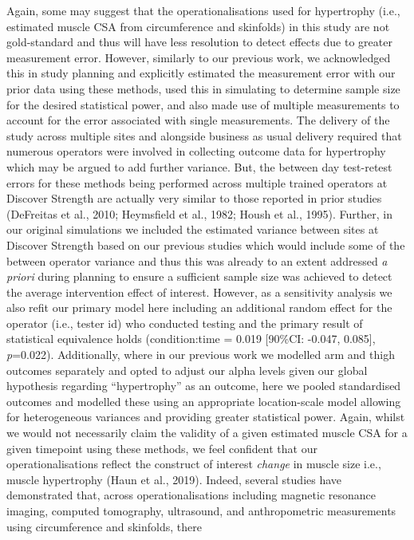 \documentclass[
]{article}
\begin{document}
Again, some may suggest that the operationalisations used for
hypertrophy (i.e., estimated muscle CSA from circumference and
skinfolds) in this study are not gold-standard and thus will have less
resolution to detect effects due to greater measurement error. However,
similarly to our previous work, we acknowledged this in study planning
and explicitly estimated the measurement error with our prior data using
these methods, used this in simulating to determine sample size for the
desired statistical power, and also made use of multiple measurements to
account for the error associated with single measurements. The delivery
of the study across multiple sites and alongside business as usual
delivery required that numerous operators were involved in collecting
outcome data for hypertrophy which may be argued to add further
variance. But, the between day test-retest errors for these methods
being performed across multiple trained operators at Discover Strength
are actually very similar to those reported in prior studies (DeFreitas
et al., 2010; Heymsfield et al., 1982; Housh et al., 1995). Further, in
our original simulations we included the estimated variance between
sites at Discover Strength based on our previous studies which would
include some of the between operator variance and thus this was already
to an extent addressed \emph{a priori} during planning to ensure a
sufficient sample size was achieved to detect the average intervention
effect of interest. However, as a sensitivity analysis we also refit our
primary model here including an additional random effect for the
operator (i.e., tester id) who conducted testing and the primary result
of statistical equivalence holds (condition:time = 0.019 {[}90\%CI:
-0.047, 0.085{]}, \emph{p}=0.022). Additionally, where in our previous
work we modelled arm and thigh outcomes separately and opted to adjust
our alpha levels given our global hypothesis regarding ``hypertrophy''
as an outcome, here we pooled standardised outcomes and modelled these
using an appropriate location-scale model allowing for heterogeneous
variances and providing greater statistical power. Again, whilst we
would not necessarily claim the validity of a given estimated muscle CSA
for a given timepoint using these methods, we feel confident that our
operationalisations reflect the construct of interest \emph{change} in
muscle size i.e., muscle hypertrophy (Haun et al., 2019). Indeed,
several studies have demonstrated that, across operationalisations
including magnetic resonance imaging, computed tomography, ultrasound,
and anthropometric measurements using circumference and skinfolds, there
\end{document}
